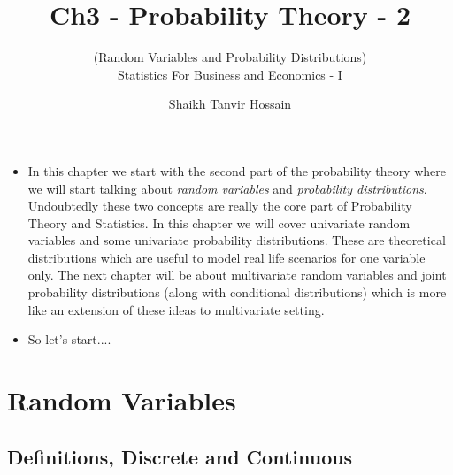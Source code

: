 \documentclass[8pt, usepdftitle=false]{beamer}
\title{\LARGE Ch3 - Probability Theory - 2}
\subtitle{{\fontsize{10}{10}\selectfont\color{gray!50!balck} 
(Random Variables and Probability Distributions)} \\
\vspace*{.2cm} Statistics For Business and Economics - I}
\author{Shaikh Tanvir Hossain\vspace*{-.4cm}}
\institute{ East West University, Dhaka\\ Last Updated \today}
\date{\vspace{-5pt}}
\begin{document}



\begin{frame}[allowframebreaks]{}

\begin{itemize}
\item In this chapter we start with the second part of the probability theory where we will start talking about \emph{random variables} and \emph{probability distributions}. Undoubtedly these two concepts are really the core part of Probability Theory and Statistics. In this chapter we will cover univariate random variables and some univariate probability distributions. These are theoretical distributions which are useful to \alert{model} real life scenarios for one variable only. The next chapter will be about multivariate random variables and joint probability distributions (along with conditional distributions) which is more like an extension of these ideas to multivariate setting.

\item So let's start...\faWalking \faWalking \faWalking.

\end{itemize}

\end{frame}



\section{Random Variables}
\frame{\sectionpage}

\subsection{Definitions, Discrete and Continuous}
\frame{\subsectionpage}
\end{document}
